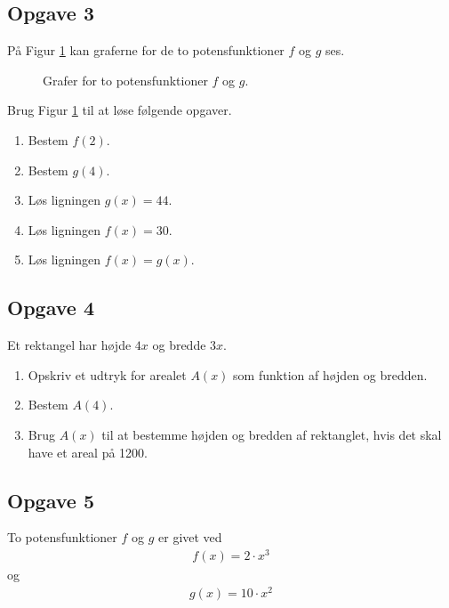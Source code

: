 \subsection*{Opgave 3}
På Figur \ref{fig:opgavegrafer} kan graferne for de to potensfunktioner $f$ og $g$ ses. 
\begin{figure}[H]
	\center
	\caption{Grafer for to potensfunktioner $f$ og $g$.}
	\label{fig:opgavegrafer}
\end{figure}
Brug Figur \ref{fig:opgavegrafer} til at løse følgende opgaver.
\begin{enumerate}[label=\roman*)]
	\item Bestem $f(2)$.
	\item Bestem $g(4)$.
	\item Løs ligningen $g(x) = 44$.
	\item Løs ligningen $f(x) = 30$.
	\item Løs ligningen $f(x) = g(x)$.
\end{enumerate}

\subsection*{Opgave 4}
Et rektangel har højde $4x$ og bredde $3x$. 
\begin{enumerate}[label=\roman*)]
	\item Opskriv et udtryk for arealet $A(x)$ som funktion af højden og bredden. 
	\item Bestem $A(4)$.
	\item Brug $A(x)$ til at bestemme højden og bredden af rektanglet, hvis det skal have et areal på 1200.
\end{enumerate}

\subsection*{Opgave 5}
To potensfunktioner $f$ og $g$ er givet ved
\begin{align*}
	f(x) = 2\cdot x^3
\end{align*}
og 
\begin{align*}
	g(x) = 10 \cdot x^2
\end{align*}

